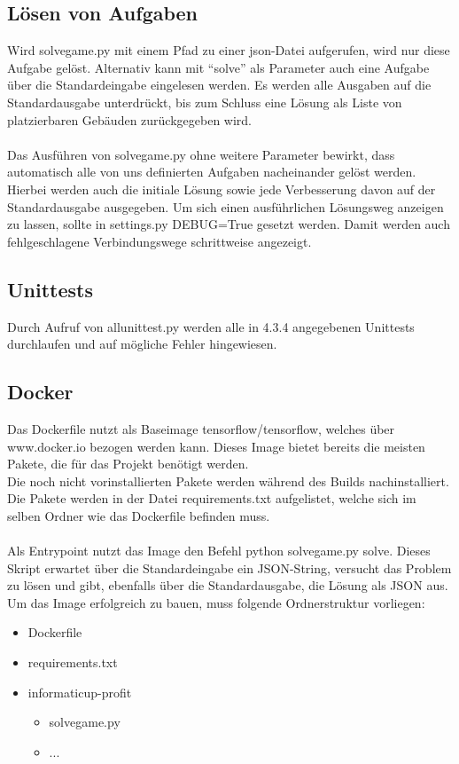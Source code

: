 \subsection{Lösen von Aufgaben}
Wird solve\textunderscore{}game.py mit einem Pfad zu einer json-Datei aufgerufen, wird nur diese Aufgabe gelöst. Alternativ kann mit “solve” als Parameter auch eine Aufgabe über die Standardeingabe eingelesen werden. Es werden alle Ausgaben auf die Standardausgabe unterdrückt, bis zum Schluss eine Lösung als Liste von platzierbaren Gebäuden zurückgegeben wird. 
\\\\
Das Ausführen von solve\textunderscore{}game.py ohne weitere Parameter bewirkt, dass automatisch alle von uns definierten Aufgaben nacheinander gelöst werden. Hierbei werden auch die initiale Lösung sowie jede Verbesserung davon auf der Standardausgabe ausgegeben. Um sich einen ausführlichen Lösungsweg anzeigen zu lassen, sollte in settings.py DEBUG=True gesetzt werden. Damit werden auch fehlgeschlagene Verbindungswege schrittweise angezeigt.

\subsection{Unittests}
Durch Aufruf von all\textunderscore{}unit\textunderscore{}test.py werden alle in 4.3.4 angegebenen Unittests durchlaufen und auf mögliche Fehler hingewiesen.

\subsection{Docker}
Das Dockerfile nutzt als Baseimage tensorflow/tensorflow, welches über www.docker.io bezogen werden kann. Dieses Image bietet bereits die meisten Pakete, die für das Projekt benötigt werden.
\\
Die noch nicht vorinstallierten Pakete werden während des Builds nachinstalliert. Die Pakete werden in der Datei requirements.txt aufgelistet, welche sich im selben Ordner wie das Dockerfile befinden muss.
\\\\
Als Entrypoint nutzt das Image den Befehl python solve\textunderscore{}game.py solve. Dieses Skript erwartet über die Standardeingabe ein JSON-String, versucht das Problem zu lösen und gibt, ebenfalls über die Standardausgabe, die Lösung als JSON aus.
\\
Um das Image erfolgreich zu bauen, muss folgende Ordnerstruktur vorliegen:
\begin{itemize}
	\item Dockerfile
	\item requirements.txt
	\item informaticup-profit
	\begin{itemize}
		\item solve\textunderscore{}game.py
		\item ...
	\end{itemize}
\end{itemize}

